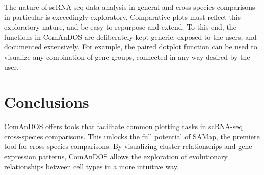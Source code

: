 \documentclass{article}
\begin{document}
The nature of scRNA-seq data analysis in general and cross-species comparisons in particular is
exceedingly exploratory. Comparative plots must reflect this exploratory nature, and be easy to
repurpose and extend. To this end, the functions in ComAnDOS are deliberately kept generic, exposed
to the users, and documented extensively. For example, the paired dotplot function can be used to
visualize any combination of gene groups, connected in any way desired by the user.

\section{}

\section{Conclusions}

ComAnDOS offers tools that facilitate common plotting tasks in scRNA-seq cross-species comparisons.
This unlocks the full potential of SAMap, the premiere tool for cross-species comparisons. By
visualizing cluster relationships and gene expression patterns, ComAnDOS allows the exploration of
evolutionary relationships between cell types in a more intuitive way.




\end{document}
